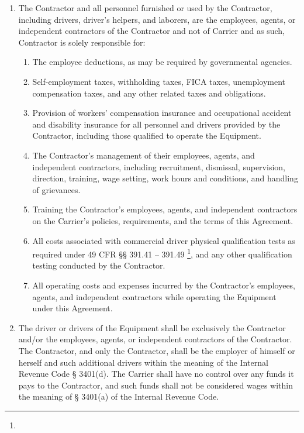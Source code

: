 \begin{enumerate}[
    ref = \SecondLevelEnumerator
]
    \item The Contractor and all personnel furnished or used by the
    Contractor, including drivers, driver's helpers, and laborers, are the
    employees, agents, or independent contractors of the Contractor and not
    of Carrier and as such, Contractor is solely responsible for:
    \begin{enumerate}[
        ref = \ThirdLevelEnumerator
    ]
        \item The employee deductions, as may be required by governmental
        agencies.
        
        \item Self-employment taxes, withholding taxes, FICA taxes,
        unemployment compensation taxes, and any other related taxes and
        obligations.

        \item Provision of workers' compensation insurance and occupational
        accident and disability insurance for all personnel and drivers
        provided by the Contractor, including those qualified to operate
        the Equipment.

        \item The Contractor's management of their employees, agents, and
        independent contractors, including recruitment, dismissal,
        supervision, direction, training, wage setting, work hours and
        conditions, and handling of grievances.

        \item Training the Contractor's employees, agents, and independent
        contractors on the Carrier's policies, requirements, and the terms
        of this Agreement.

        \item All costs associated with commercial driver physical
        qualification tests as required under 49 CFR {\S\S} 391.41 --
        391.49 \footnote{\PhysicalQualificationsAndExaminationsFootnote},
        and any other qualification testing conducted by the Contractor.

        \item All operating costs and expenses incurred by the Contractor’s
        employees, agents, and independent contractors while operating the
        Equipment under this Agreement.
    \end{enumerate}

    \item The driver or drivers of the Equipment shall be exclusively the
    Contractor and/or the employees, agents, or independent contractors of
    the Contractor. The Contractor, and only the Contractor, shall be the
    employer of himself or herself and such additional drivers within the
    meaning of the Internal Revenue Code {\S} 3401(d). The Carrier shall
    have no control over any funds it pays to the Contractor, and such
    funds shall not be considered wages within the meaning of {\S} 3401(a)
    of the Internal Revenue Code.


\end{enumerate}
